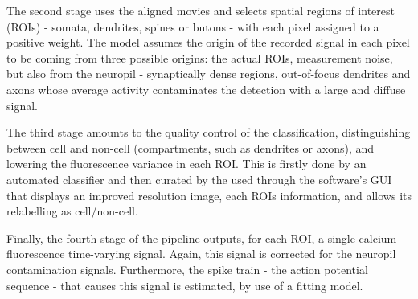 The second stage uses the aligned movies and selects spatial regions of interest (ROIs) - somata, dendrites, spines or butons - with each pixel assigned to a positive weight. The model assumes the origin of the recorded signal in each pixel to be coming from three possible origins: the actual ROIs, measurement noise, but also from the neuropil - synaptically dense regions, out-of-focus dendrites and axons whose average activity contaminates the detection with a large and diffuse signal. %



The third stage amounts to the quality control of the classification, distinguishing between cell and non-cell (compartments, such as dendrites or axons), and lowering the fluorescence variance in each ROI. This is firstly done by an automated classifier and then curated by the used through the software's GUI that displays an improved resolution image, each ROIs information,  and allows its relabelling as cell/non-cell.

Finally, the fourth stage of the pipeline outputs, for each ROI, a single calcium fluorescence time-varying signal. Again, this signal is corrected for the neuropil contamination signals. Furthermore, the spike train - the action potential sequence - that causes this signal is estimated, by use of a fitting model. 

